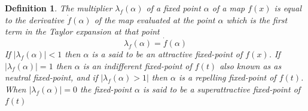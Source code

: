 \documentclass{article}
\newtheorem{definition}{Definition}
\begin{document}
\begin{definition}
  The multiplier $\lambda_f (\alpha)$ of a fixed point $\alpha$ of a map $f
  (x)$ is equal to the derivative $\dot{f} (\alpha)$ of the map evaluated at
  the point $\alpha$ which is the first term in the Taylor expansion at that
  point
  \begin{equation}
    \lambda_f (\alpha) = \dot{f} (\alpha)
  \end{equation}
  If $| \lambda_f (\alpha) | < 1$ then $\alpha$ is a said to be an attractive
  fixed-point of $f (x)$. If $| \lambda_f (\alpha) | = 1$ then $\alpha$ is an
  indifferent fixed-point of $f (t)$ also known as as neutral fixed-point, and
  if $| \lambda_f (\alpha) > 1 |$ then $\alpha$ is a repelling fixed-point of
  $f (t)$. When $| \lambda_f (\alpha) | = 0$ the fixed-point $\alpha$ is said
  to be a superattractive fixed-point of $f
  (t)${\cite[3.]{raadstrom1953iteration}}
\end{definition}
\end{document}
